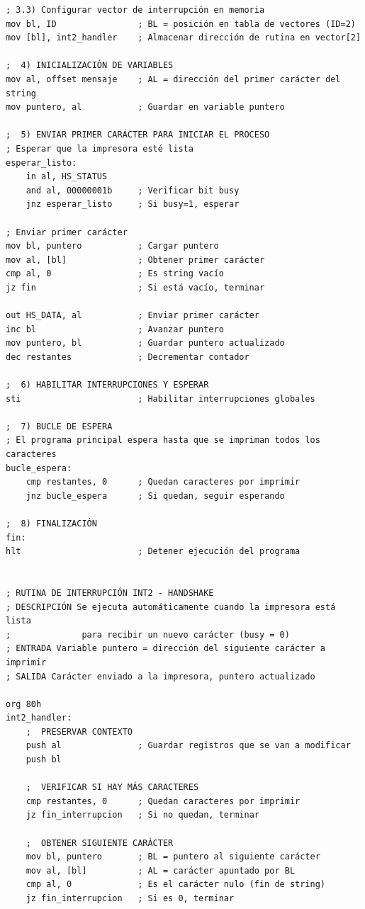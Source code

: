 \documentclass[12pt,oneside]{templates/unerthesis}
\begin{document}
\begin{lstlisting}
; 3.3) Configurar vector de interrupción en memoria
mov bl, ID                ; BL = posición en tabla de vectores (ID=2)
mov [bl], int2_handler    ; Almacenar dirección de rutina en vector[2]

;  4) INICIALIZACIÓN DE VARIABLES 
mov al, offset mensaje    ; AL = dirección del primer carácter del string
mov puntero, al           ; Guardar en variable puntero

;  5) ENVIAR PRIMER CARÁCTER PARA INICIAR EL PROCESO 
; Esperar que la impresora esté lista
esperar_listo:
    in al, HS_STATUS
    and al, 00000001b     ; Verificar bit busy
    jnz esperar_listo     ; Si busy=1, esperar

; Enviar primer carácter
mov bl, puntero           ; Cargar puntero
mov al, [bl]              ; Obtener primer carácter
cmp al, 0                 ; Es string vacío
jz fin                    ; Si está vacío, terminar

out HS_DATA, al           ; Enviar primer carácter
inc bl                    ; Avanzar puntero
mov puntero, bl           ; Guardar puntero actualizado
dec restantes             ; Decrementar contador

;  6) HABILITAR INTERRUPCIONES Y ESPERAR 
sti                       ; Habilitar interrupciones globales

;  7) BUCLE DE ESPERA
; El programa principal espera hasta que se impriman todos los caracteres
bucle_espera:
    cmp restantes, 0      ; Quedan caracteres por imprimir
    jnz bucle_espera      ; Si quedan, seguir esperando

;  8) FINALIZACIÓN 
fin:
hlt                       ; Detener ejecución del programa


; RUTINA DE INTERRUPCIÓN INT2 - HANDSHAKE
; DESCRIPCIÓN Se ejecuta automáticamente cuando la impresora está lista
;              para recibir un nuevo carácter (busy = 0)
; ENTRADA Variable puntero = dirección del siguiente carácter a imprimir
; SALIDA Carácter enviado a la impresora, puntero actualizado

org 80h
int2_handler:
    ;  PRESERVAR CONTEXTO 
    push al               ; Guardar registros que se van a modificar
    push bl

    ;  VERIFICAR SI HAY MÁS CARACTERES 
    cmp restantes, 0      ; Quedan caracteres por imprimir
    jz fin_interrupcion   ; Si no quedan, terminar

    ;  OBTENER SIGUIENTE CARÁCTER 
    mov bl, puntero       ; BL = puntero al siguiente carácter
    mov al, [bl]          ; AL = carácter apuntado por BL
    cmp al, 0             ; Es el carácter nulo (fin de string)
    jz fin_interrupcion   ; Si es 0, terminar


\end{lstlisting}
\end{document}
